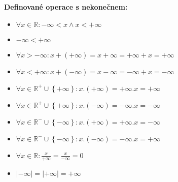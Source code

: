 \noindent \textbf{Definované operace s nekonečnem:}
\begin{itemize}
    \item \( \forall x \in \mathbb{R} : -\infty < x \land x < +\infty \)
    \item \( -\infty < +\infty \)
    \item \( \forall x > -\infty : x + (+\infty) = x + \infty = +\infty + x = +\infty \)
    \item \( \forall x < +\infty : x + (-\infty) = x - \infty = -\infty + x = -\infty \)
    \item \( \forall x \in \mathbb{R}^+ \cup \left\{+\infty \right\} : x . (+\infty) = +\infty . x = +\infty \)
    \item \( \forall x \in \mathbb{R}^+ \cup \left\{+\infty \right\} : x . (-\infty) = -\infty . x = -\infty \)
    \item \( \forall x \in \mathbb{R}^- \cup \left\{-\infty \right\} : x . (+\infty) = +\infty . x = -\infty \)
    \item \( \forall x \in \mathbb{R}^- \cup \left\{-\infty \right\} : x . (-\infty) = -\infty . x = +\infty \)
    \item \( \forall x \in \mathbb{R} : \frac{x}{+\infty} = \frac{x}{-\infty} = 0 \)
    \item \( |-\infty | = |+\infty | = +\infty \)
\end{itemize}
